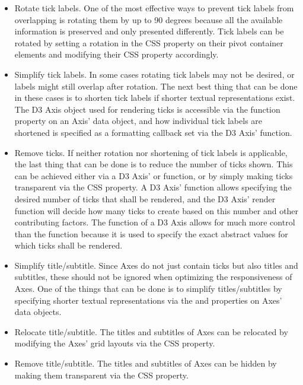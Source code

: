 \begin{itemize}

\item
Rotate tick labels.
One of the most effective ways to prevent tick labels from overlapping is rotating them by up to 90 degrees because all the available information is preserved and only presented differently.
Tick labels can be rotated by setting a rotation in the CSS  property on their pivot container elements and modifying their CSS  property accordingly. 

\item
Simplify tick labels.
In some cases rotating tick labels may not be desired, or labels might still overlap after rotation.
The next best thing that can be done in these cases is to shorten tick labels if shorter textual representations exist.
The D3 Axis object used for rendering ticks is accessible via the  function property on an Axis' data object, and how individual tick labels are shortened is specified as a formatting callback set via the D3 Axis'  function.

\item
Remove ticks.
If neither rotation nor shortening of tick labels is applicable, the last thing that can be done is to reduce the number of ticks shown.
This can be achieved either via a D3 Axis'  or  function, or by simply making ticks transparent via the CSS  property.
A D3 Axis'  function allows specifying the desired number of ticks that shall be rendered, and the D3 Axis' render function will decide how many ticks to create based on this number and other contributing factors.
The  function of a D3 Axis allows for much more control than the  function because it is used to specify the exact abstract values for which ticks shall be rendered.

\item
Simplify title/subtitle.
Since Axes do not just contain ticks but also titles and subtitles, these should not be ignored when optimizing the responsiveness of Axes.
One of the things that can be done is to simplify titles/subtitles by specifying shorter textual representations via the  and  properties on Axes' data objects.

\item
Relocate title/subtitle.
The titles and subtitles of Axes can be relocated by modifying the Axes' grid layouts via the CSS  property. 

\item
Remove title/subtitle.
The titles and subtitles of Axes can be hidden by making them transparent via the CSS  property.

\end{itemize}

